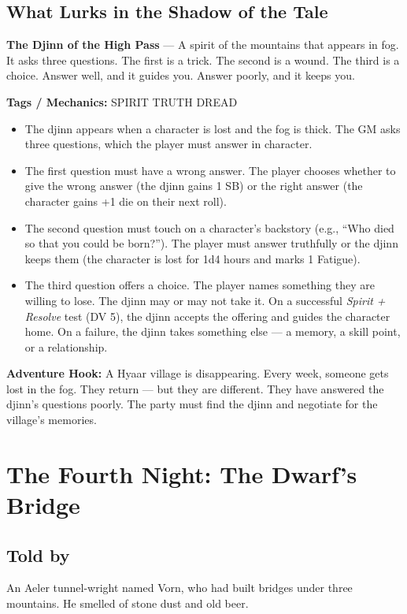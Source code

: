 \documentclass[10pt,twoside]{book}
\newcommand{\tag}[1]{\textsc{#1}}
\begin{document}
\section*{What Lurks in the Shadow of the Tale}
\begin{infobox}
\textbf{The Djinn of the High Pass} --- A spirit of the mountains that appears in fog. It asks three questions. The first is a trick. The second is a wound. The third is a choice. Answer well, and it guides you. Answer poorly, and it keeps you.

\textbf{Tags / Mechanics:} \tag{SPIRIT} \tag{TRUTH} \tag{DREAD}

\begin{itemize}
\item The djinn appears when a character is lost and the fog is thick. The GM asks three questions, which the player must answer in character.
\item The first question must have a wrong answer. The player chooses whether to give the wrong answer (the djinn gains 1 SB) or the right answer (the character gains +1 die on their next roll).
\item The second question must touch on a character's backstory (e.g., ``Who died so that you could be born?''). The player must answer truthfully or the djinn keeps them (the character is lost for 1d4 hours and marks 1 Fatigue).
\item The third question offers a choice. The player names something they are willing to lose. The djinn may or may not take it. On a successful \textit{Spirit + Resolve} test (DV 5), the djinn accepts the offering and guides the character home. On a failure, the djinn takes something else --- a memory, a skill point, or a relationship.
\end{itemize}

\textbf{Adventure Hook:} A Hyaar village is disappearing. Every week, someone gets lost in the fog. They return --- but they are different. They have answered the djinn's questions poorly. The party must find the djinn and negotiate for the village's memories.
\end{infobox}

\chapter{The Fourth Night: The Dwarf's Bridge}

\section*{Told by}
An Aeler tunnel-wright named Vorn, who had built bridges under three mountains. He smelled of stone dust and old beer.
\end{document}
